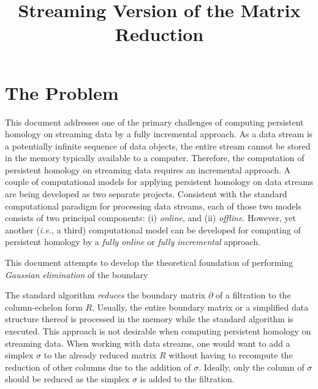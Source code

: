 \documentclass[11pt]{article}
\begin{document}
\title{Streaming Version of the Matrix Reduction}

\maketitle

\section{The Problem}

This document addresses one of the primary challenges of computing persistent homology on streaming 
data by a fully incremental approach.  As a data stream is a potentially infinite sequence of data 
objects, the entire stream cannot be stored in the memory typically available to a computer.  
Therefore, the computation of persistent homology on streaming data requires an incremental 
approach. A couple of computational models for applying persistent homology on data streams are 
being developed as two separate projects.  Consistent with the standard computational paradigm 
\cite{silva-13} for processing data streams, each of those two models consists of two principal 
components: (i) \emph{online}, and (ii) \emph{offline}.  However, yet another (\emph{i.e.}, a 
third) computational model can be developed for computing of persistent homology by a \emph{fully 
online} or \emph{fully incremental} approach.

This document attempts to develop the theoretical foundation of performing \emph{Gaussian 
elimination} of the boundary 


The standard algorithm \cite{edelsbrunner-00, zomorodian-05} \emph{reduces} the boundary matrix 
$\partial$ of a filtration \cite{zomorodian-10} to the column-echelon form $R$.  Usually, the 
entire boundary matrix or a simplified data structure thereof is processed in the memory while the 
standard algorithm is executed.  This approach is not desirable when computing persistent homology 
on streaming data.    When 
working with data streams, one would want to add a simplex $\sigma$ to the already reduced matrix 
$R$ without having to recompute the reduction of other columns due to the addition of $\sigma$.  
Ideally, only the column of $\sigma$ should be reduced as the simplex $\sigma$ is added to the 
filtration.





\end{document}
